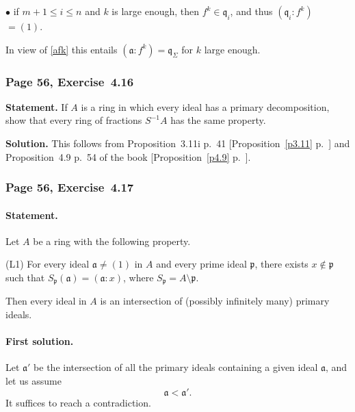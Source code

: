 \documentclass[12pt,letterpaper]{article}%
\newcommand{\mf}{\mathfrak}
\newcommand{\aaa}{\mf a}
\newcommand{\qqq}{\mf q}
\newcommand{\bu}{\bullet}
\newcommand{\nn}{\noindent}
\begin{document}
\nn$\bu$ if $m+1\le i\le n$ and $k$ is large enough, then $f^k\in\qqq_i$, and thus $(\qqq_i:f^k)$ $=(1)$.

In view of \eqref{afk} this entails $(\aaa:f^k)=\qqq_\Sigma$ for $k$ large enough.

\subsubsection{Page 56, Exercise~4.16}%

\textbf{Statement.} If $A$ is a ring in which every ideal has a primary decomposition, show that every ring of fractions $S^{-1}A$ has the same property.

\nn\textbf{Solution.} This follows from Proposition~3.11i p.~41 [Proposition~\ref{p3.11} p.~\pageref{p3.11}] and Proposition~4.9 p.~54 of the book [Proposition~\ref{p4.9} p.~\pageref{p4.9}].

\subsubsection{Page 56, Exercise~4.17}%

\paragraph{Statement.}\label{ex4.17}%

Let $A$ be a ring with the following property.

\nn(L1) For every ideal $\mathfrak a\ne(1)$ in $A$ and every prime ideal $\mathfrak p$, there exists $x\notin\mathfrak p$ such that $S_{\mathfrak p}(\mathfrak a)=(\mathfrak a:x)$, where $S_{\mathfrak p}=A\setminus\mathfrak p$.

Then every ideal in $A$ is an intersection of (possibly infinitely many) primary ideals.

\paragraph{First solution.}%

Let $\aaa'$ be the intersection of all the primary ideals containing a given ideal $\aaa$, and let us assume  
\begin{equation}\label{abs417}
\aaa<\aaa'.
\end{equation} 
It suffices to reach a contradiction.
\end{document}
